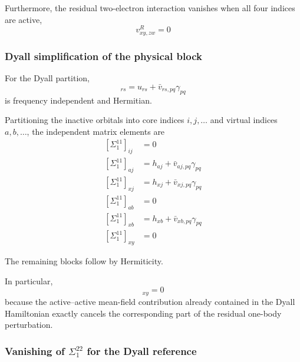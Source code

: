 \documentclass[aip,jcp,reprint,noshowkeys,superscriptaddress]{revtex4-1}
\begin{document}
Furthermore, the residual two-electron interaction vanishes when all
four indices are active,
\begin{equation}
  v^R_{xy,zw}=0
  \label{eq:residual-all-active-zero}
\end{equation}


\subsubsection{Dyall simplification of the physical block}

For the Dyall partition,
\begin{equation}
  [\Sigma_1^{11}]_{rs}
  =
  u_{rs}
  +
  \bar v_{rs,pq}\gamma_{pq}
\end{equation}
is frequency independent and Hermitian.

Partitioning the inactive orbitals into core indices $i,j,\ldots$ and
virtual indices $a,b,\ldots$, the independent matrix elements are
\begin{subequations}
  \label{eq:dyall-sigma11-blocks}
  \begin{align}
    [\Sigma_1^{11}]_{ij}
    &=
    0
    \\
    [\Sigma_1^{11}]_{aj}
    &=
    h_{aj}
    +
    \bar v_{aj,pq}\gamma_{pq}
    \\
    [\Sigma_1^{11}]_{xj}
    &=
    h_{xj}
    +
    \bar v_{xj,pq}\gamma_{pq}
    \\
    [\Sigma_1^{11}]_{ab}
    &=
    0
    \\
    [\Sigma_1^{11}]_{xb}
    &=
    h_{xb}
    +
    \bar v_{xb,pq}\gamma_{pq}
    \\
    [\Sigma_1^{11}]_{xy}
    &=
    0
  \end{align}
\end{subequations}

The remaining blocks follow by Hermiticity.

In particular,
\begin{equation}
  [\Sigma_1^{11}]_{xy}=0
  \label{eq:active-active-sigma11-zero}
\end{equation}
because the active--active mean-field contribution already contained
in the Dyall Hamiltonian exactly cancels the corresponding part of the
residual one-body perturbation.


\subsubsection{Vanishing of \texorpdfstring{$\Sigma_1^{22}$}{Sigma22} for the Dyall reference}
\end{document}
